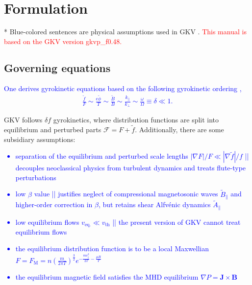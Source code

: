 \chapter{Formulation}
\label{chap:Formulation}

* Blue-colored sentences are physical assumptions used in GKV \cite{Watanabe2006NF}. 
\textcolor{red}{This manual is based on the GKV version gkvp\_f0.48.}

\section{Governing equations}
\label{sec:Governing equations}

\textcolor{blue}{One derives gyrokinetic equations based on the following gyrokinetic ordering \cite{Garbet2010NF},
\begin{align}
  \frac{\tilde{f}}{F} \sim \frac{e\tilde{\phi}}{T} \sim \frac{\tilde{B}}{B} \sim \frac{k_\parallel}{k_\perp} \sim \frac{\omega}{\Omega} \equiv \delta \ll 1. \label{eq:gyrokinetic_ordering}
\end{align}}

GKV follows $\delta f$ gyrokinetics, where distribution functions are split into equilibrium and perturbed parts $\mathcal{F}=F+\tilde{f}$. Additionally, there are some subsidiary assumptions:
\textcolor{blue}{\begin{itemize}
\item separation of the equilibrium and perturbed scale lengths $|\nabla F|/F \ll |\nabla \tilde{f}|/f$ || decouples neoclassical physics from turbulent dynamics and treats flute-type perturbations
\item low $\beta$ value || justifies neglect of compressional magnetosonic waves $\tilde{B}_\parallel$ and higher-order correction in $\beta$, but retains shear Alfv\'{e}nic dynamics $\tilde{A}_\parallel$
\item low equilibrium flows $v_\mathrm{eq.} \ll v_\mathrm{th}$ || the present version of GKV cannot treat equilibrium flows
\item the equilibrium distribution function is to be a local Maxwellian $F=F_\mathrm{M}=n \left(\frac{m}{2 \pi T}\right)^\frac{3}{2} e^{-\frac{mv_\parallel^2}{2T}-\frac{\mu B}{T}}$
\item the equilibrium magnetic field satisfies the MHD equilibrium $\nabla P = \bm{J} \times \bm{B}$
\end{itemize}}

